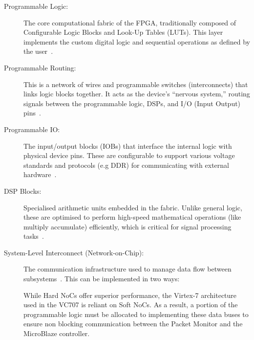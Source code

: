 \begin{description}
      \item[Programmable Logic:] The core computational fabric of the FPGA, traditionally
            composed of Configurable Logic Blocks and Look-Up Tables (LUTs). This layer
            implements the custom digital logic and sequential operations as defined by the
            user~\cite{boutros_fpga_2021}.

      \item[Programmable Routing:] This is a network of wires and programmable switches
            (interconnects) that links logic blocks together. It acts as the device's
            ``nervous system,'' routing signals between the programmable logic, DSPs, and
            I/O (Input Output) pins~\cite{boutros_fpga_2021}.

      \item[Programmable IO:] The input/output blocks (IOBs) that interface the internal
            logic with physical device pins. These are configurable to support various
            voltage standards and protocols (e.g DDR) for communicating with external
            hardware~\cite{boutros_fpga_2021}.

      \item[DSP Blocks:] Specialised arithmetic units embedded in the fabric. Unlike
            general logic, these are optimised to perform high-speed mathematical
            operations (like multiply accumulate) efficiently, which is critical for signal
            processing tasks~\cite{boutros_fpga_2021}.

      \item[System-Level Interconnect (Network-on-Chip):] The communication infrastructure used to manage data flow between subsystems~\cite{boutros_fpga_2021}. This can be implemented in two ways:
    While Hard NoCs offer superior performance, the Virtex-7 architecture used in the VC707 is reliant on Soft NoCs. As a result, a portion of the programmable logic must be allocated to implementing these data buses to ensure non blocking communication between the Packet Monitor and the MicroBlaze controller.


\end{description}
